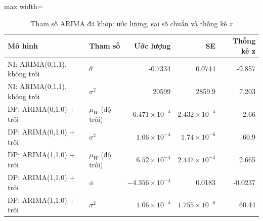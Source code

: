 \begin{table}[H]
\centering\footnotesize
\caption{Tham số ARIMA đã khớp: ước lượng, sai số chuẩn và thống kê $z$}\label{tab:tab_b12_05_arima_params}
\begin{adjustbox}{max width=\linewidth}
\begin{tabular}{|l|l|r|r|r|}
\toprule
Mô hình & Tham số & Ước lượng & SE & Thống kê z \\
\midrule
NI: ARIMA(0,1,1), không trôi & $\theta$ & -0.7334 & 0.0744 & -9.857 \\
NI: ARIMA(0,1,1), không trôi & $\sigma^{2}$ & 20599 & 2859.9 & 7.203 \\
DP: ARIMA(0,1,0) + trôi & $\mu_{W}$ (độ trôi) & $6.471\times10^{-4}$ & $2.432\times10^{-4}$ & 2.66 \\
DP: ARIMA(0,1,0) + trôi & $\sigma^{2}$ & $1.06\times10^{-4}$ & $1.74\times10^{-6}$ & 60.9 \\
DP: ARIMA(1,1,0) + trôi & $\mu_{W}$ (độ trôi) & $6.52\times10^{-4}$ & $2.447\times10^{-4}$ & 2.665 \\
DP: ARIMA(1,1,0) + trôi & $\phi$ & $-4.356\times10^{-4}$ & 0.0183 & -0.0237 \\
DP: ARIMA(1,1,0) + trôi & $\sigma^{2}$ & $1.06\times10^{-4}$ & $1.755\times10^{-6}$ & 60.44 \\
\bottomrule
\end{tabular}
\end{adjustbox}
\end{table}
